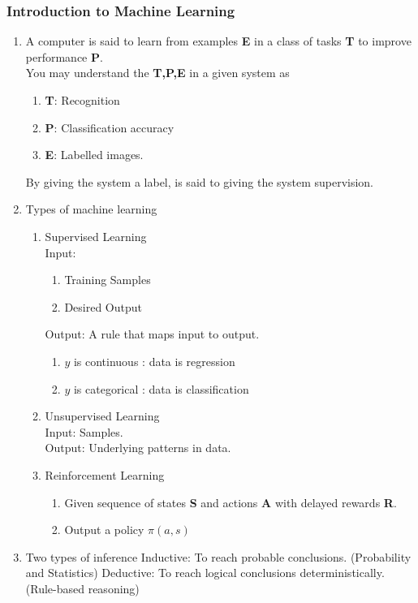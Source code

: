 \documentclass{article}
\begin{document}
\subsubsection{Introduction to Machine Learning}
\begin{enumerate}
    \item A computer is said to learn from examples \textbf{E} in a class of tasks \textbf{T} to improve performance \textbf{P}.\\
        You may understand the \textbf{T,P,E} in a given system as
        \begin{enumerate}
            \item \textbf{T}: Recognition
            \item \textbf{P}: Classification accuracy
            \item \textbf{E}: Labelled images.
        \end{enumerate}
        By giving the system a label, is said to giving the system supervision.
    \item Types of machine learning
    \begin{enumerate}
        \item Supervised Learning \\
        Input:
        \begin{enumerate}
            \item Training Samples
            \item Desired Output
        \end{enumerate}
        Output: A rule that maps input to output.
        \begin{enumerate}
            \item $y$ is continuous : data is regression
            \item $y$ is categorical : data is classification
        \end{enumerate}
        \item Unsupervised Learning \\
        Input: Samples. \\
        Output: Underlying patterns in data.
        \item Reinforcement Learning
        \begin{enumerate}
            \item Given sequence of states \textbf{S} and actions \textbf{A} with delayed rewards \textbf{R}.
            \item Output a policy $\pi(a,s)$
        \end{enumerate}
    \end{enumerate}
    \item Two types of inference
    Inductive: To reach probable conclusions. (Probability and Statistics)
    Deductive: To reach logical conclusions deterministically. (Rule-based reasoning)
\end{enumerate}
\end{document}
